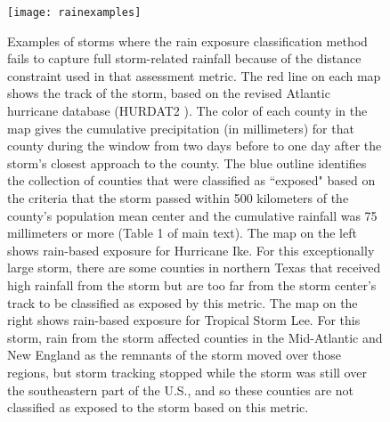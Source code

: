 \documentclass[11pt, titlepage]{article}
\begin{document}
\begin{figure}[tbhp!]
\centering
\texttt{[image: rainexamples]}
\caption{Examples of storms where the rain exposure classification method fails to capture full storm-related rainfall because of the distance constraint used in that assessment metric. The red line on each map shows the track of the storm, based on the revised Atlantic hurricane database (HURDAT2 \citep{landsea2013}). The color of each county in the map gives the cumulative precipitation (in millimeters) for that county during the window from two days before to one day after the storm's closest approach to the county. The blue outline identifies the collection of counties that were classified as ``exposed" based on the criteria that the storm passed within 500 kilometers of the county's population mean center and the cumulative rainfall was 75 millimeters or more (Table 1 of main text). The map on the left shows rain-based exposure for Hurricane Ike. For this exceptionally large storm, there are some counties in northern Texas that received high rainfall from the storm but are too far from the storm center's track to be classified as exposed by this metric. The map on the right shows rain-based exposure for Tropical Storm Lee. For this storm, rain from the storm affected counties in the Mid-Atlantic and New England as the remnants of the storm moved over those regions, but storm tracking stopped while the storm was still over the southeastern part of the U.S., and so these counties are not classified as exposed to the storm based on this metric.}
\label{fig:rainexamples}
\end{figure}

\clearpage




\end{document}
